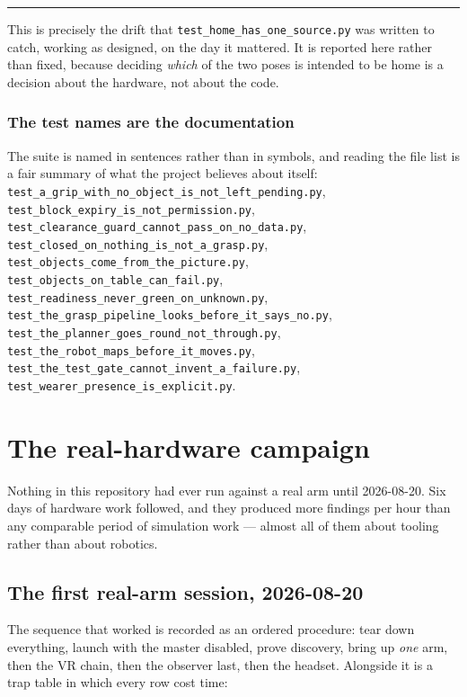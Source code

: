 \documentclass[11pt,a4paper,oneside]{report}
\newcommand{\file}[1]{\texttt{\small #1}}
\newcommand{\keyfact}[1]{%
  \par\vspace{7pt}\noindent
  \hspace*{0pt}\textcolor{srlblue}{\rule{2.5pt}{\dimexpr\baselineskip\relax}}%
  \hspace{9pt}%
  \begin{minipage}[t]{\dimexpr\textwidth-14pt\relax}
  \small #1
  \end{minipage}\par\vspace{7pt}}
\begin{document}
\keyfact{This is precisely the drift that
\file{test\_home\_has\_one\_source.py} was written to catch, working as
designed, on the day it mattered. It is reported here rather than fixed,
because deciding \emph{which} of the two poses is intended to be home is a
decision about the hardware, not about the code.}

\subsection{The test names are the documentation}

The suite is named in sentences rather than in symbols, and reading the file
list is a fair summary of what the project believes about itself:
\file{test\_a\_grip\_with\_no\_object\_is\_not\_left\_pending.py},
\file{test\_block\_expiry\_is\_not\_permission.py},
\file{test\_clearance\_guard\_cannot\_pass\_on\_no\_data.py},
\file{test\_closed\_on\_nothing\_is\_not\_a\_grasp.py},
\file{test\_objects\_come\_from\_the\_picture.py},
\file{test\_objects\_on\_table\_can\_fail.py},
\file{test\_readiness\_never\_green\_on\_unknown.py},
\file{test\_the\_grasp\_pipeline\_looks\_before\_it\_says\_no.py},
\file{test\_the\_planner\_goes\_round\_not\_through.py},
\file{test\_the\_robot\_maps\_before\_it\_moves.py},
\file{test\_the\_test\_gate\_cannot\_invent\_a\_failure.py},
\file{test\_wearer\_presence\_is\_explicit.py}.

\chapter{The real-hardware campaign}

Nothing in this repository had ever run against a real arm until 2026-08-20.
Six days of hardware work followed, and they produced more findings per hour
than any comparable period of simulation work --- almost all of them about
tooling rather than about robotics.

\section{The first real-arm session, 2026-08-20}

The sequence that worked is recorded as an ordered procedure: tear down
everything, launch with the master disabled, prove discovery, bring up
\emph{one} arm, then the VR chain, then the observer last, then the headset.
Alongside it is a trap table in which every row cost time:
\end{document}
